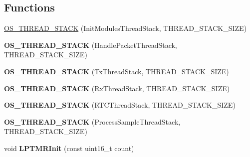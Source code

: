 \subsection*{Functions}
\begin{DoxyCompactItemize}
\item 
\hyperlink{group__main__module_gac2875955d67e96abf6cfa8aaad5e9f75}{O\+S\+\_\+\+T\+H\+R\+E\+A\+D\+\_\+\+S\+T\+A\+C\+K} (Init\+Modules\+Thread\+Stack, T\+H\+R\+E\+A\+D\+\_\+\+S\+T\+A\+C\+K\+\_\+\+S\+I\+Z\+E)
\item 
\hypertarget{group__main__module_ga863739b8166c7847e6fc32abf299778f}{}{\bfseries O\+S\+\_\+\+T\+H\+R\+E\+A\+D\+\_\+\+S\+T\+A\+C\+K} (Handle\+Packet\+Thread\+Stack, T\+H\+R\+E\+A\+D\+\_\+\+S\+T\+A\+C\+K\+\_\+\+S\+I\+Z\+E)\label{group__main__module_ga863739b8166c7847e6fc32abf299778f}

\item 
\hypertarget{group__main__module_ga778895bd4e748afb96680200b9c95639}{}{\bfseries O\+S\+\_\+\+T\+H\+R\+E\+A\+D\+\_\+\+S\+T\+A\+C\+K} (Tx\+Thread\+Stack, T\+H\+R\+E\+A\+D\+\_\+\+S\+T\+A\+C\+K\+\_\+\+S\+I\+Z\+E)\label{group__main__module_ga778895bd4e748afb96680200b9c95639}

\item 
\hypertarget{group__main__module_ga1d037f91698507378c2715a141f03cd7}{}{\bfseries O\+S\+\_\+\+T\+H\+R\+E\+A\+D\+\_\+\+S\+T\+A\+C\+K} (Rx\+Thread\+Stack, T\+H\+R\+E\+A\+D\+\_\+\+S\+T\+A\+C\+K\+\_\+\+S\+I\+Z\+E)\label{group__main__module_ga1d037f91698507378c2715a141f03cd7}

\item 
\hypertarget{group__main__module_gaf542ff0cb6e301b6f9f38531adcf0413}{}{\bfseries O\+S\+\_\+\+T\+H\+R\+E\+A\+D\+\_\+\+S\+T\+A\+C\+K} (R\+T\+C\+Thread\+Stack, T\+H\+R\+E\+A\+D\+\_\+\+S\+T\+A\+C\+K\+\_\+\+S\+I\+Z\+E)\label{group__main__module_gaf542ff0cb6e301b6f9f38531adcf0413}

\item 
\hypertarget{group__main__module_ga2f432c35e60d035b5e50e153be074577}{}{\bfseries O\+S\+\_\+\+T\+H\+R\+E\+A\+D\+\_\+\+S\+T\+A\+C\+K} (Process\+Sample\+Thread\+Stack, T\+H\+R\+E\+A\+D\+\_\+\+S\+T\+A\+C\+K\+\_\+\+S\+I\+Z\+E)\label{group__main__module_ga2f432c35e60d035b5e50e153be074577}

\item 
\hypertarget{group__main__module_gaeac4abe1062c9f3b5d9eb540e300482a}{}void {\bfseries L\+P\+T\+M\+R\+Init} (const uint16\+\_\+t count)\label{group__main__module_gaeac4abe1062c9f3b5d9eb540e300482a}


\end{DoxyCompactItemize}
